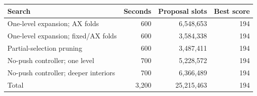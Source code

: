 \begin{center}\small
\begin{tabular}{@{}lrrr@{}}
\toprule
Search & Seconds & Proposal slots & Best score\\
\midrule
One-level expansion; AX folds & 600 & 6,548,653 & 194\\
One-level expansion; fixed/AX folds & 600 & 3,584,338 & 194\\
Partial-selection pruning & 600 & 3,487,411 & 194\\
No-push controller; one level & 700 & 5,228,572 & 194\\
No-push controller; deeper interiors & 700 & 6,366,489 & 194\\
\midrule
Total & 3,200 & 25,215,463 & 194\\
\bottomrule
\end{tabular}
\end{center}

